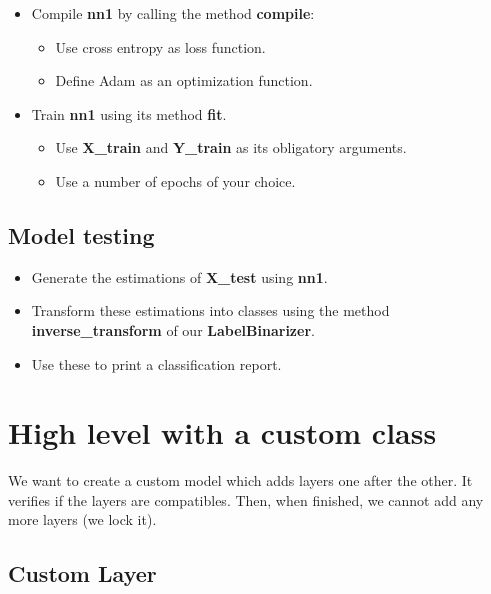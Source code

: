 \documentclass[11pt, a4paper]{article}
\begin{document}
\begin{multicols}{2}
	\begin{itemize}  
		\item Compile \textbf{nn1} by calling the method \textbf{compile}:
		\begin{itemize} 
			\item Use cross entropy as loss function.
			\item Define Adam as an optimization function.
		\end{itemize}
		\item Train \textbf{nn1} using its method \textbf{fit}.
		\begin{itemize} 
			\item Use \textbf{X\_train} and \textbf{Y\_train} as its obligatory arguments.
			\item Use a number of epochs of your choice.
		\end{itemize}
	\end{itemize}
	
	\subsection{Model testing}
	\begin{itemize}  
		\item Generate the estimations of \textbf{X\_test} using \textbf{nn1}.
		\item Transform these estimations into classes using the method \textbf{inverse\_transform} of our \textbf{LabelBinarizer}.
		\item Use these to print a classification report.
	\end{itemize}
	
	\section{High level with a custom class}
	
	We want to create a custom model which adds layers one after the other.
	It verifies if the layers are compatibles.
	Then, when finished, we cannot add any more layers (we lock it).
	
	\subsection{Custom Layer}
	

\end{multicols}
\end{document}
